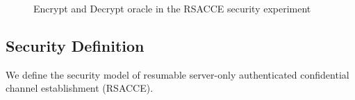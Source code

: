 \begin{figure*}[!htb]
\begin{center}
\caption{Encrypt and Decrypt oracle in the RSACCE security experiment}
 \label{fig:LHAE_rsacce}
\end{center}
\end{figure*}

\subsection{Security Definition} \label{sec:sec_def}

We define the security model of resumable server-only
authenticated confidential channel establishment (RSACCE).

